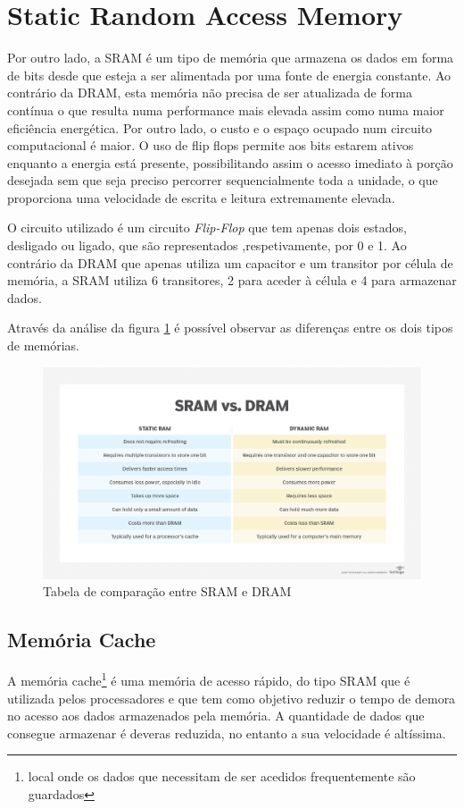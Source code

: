 \documentclass{report}
\begin{document}
\section{Static Random Access Memory}
\label{staticram}
\par Por outro lado, a \ac{SRAM} é um tipo de memória que armazena os dados em forma de bits desde que esteja a ser alimentada por uma fonte de energia constante. Ao contrário da \ac{DRAM}, esta memória não precisa de ser atualizada de forma contínua o que resulta numa performance mais elevada assim como numa maior eficiência energética. Por outro lado, o custo e o espaço ocupado num circuito computacional é maior. O uso de flip flops permite aos bits estarem ativos enquanto a energia está presente, possibilitando assim o acesso imediato à porção desejada sem que seja preciso percorrer sequencialmente toda a unidade, o que proporciona uma velocidade de escrita e leitura extremamente elevada.
\par O circuito utilizado é um circuito \textit{Flip-Flop} que tem apenas dois estados, desligado ou ligado, que são representados ,respetivamente, por 0 e 1. Ao contrário da \ac{DRAM} que apenas utiliza um capacitor e um transitor por célula de memória, a \ac{SRAM} utiliza 6 transitores, 2 para aceder à célula e 4 para armazenar dados. 
\par Através da análise da figura \ref{tabela sram dram} é possível observar as diferenças entre os dois tipos de memórias.
\begin{figure}
\includegraphics[scale=0.3]{dramsram.png}
\caption{Tabela de comparação entre \ac{SRAM} e \ac{DRAM}}
\label{tabela sram dram}
\end{figure}
\pagebreak

\subsection{Memória Cache}
\label{cache}
\par A memória cache\footnote{local onde os dados que necessitam de ser acedidos frequentemente são guardados} é uma memória de acesso rápido, do tipo \ac{SRAM} que é utilizada pelos processadores e que tem como objetivo reduzir o tempo de demora no acesso aos dados armazenados pela memória. A quantidade de dados que consegue armazenar é deveras reduzida, no entanto a sua velocidade é altíssima.
\end{document}
